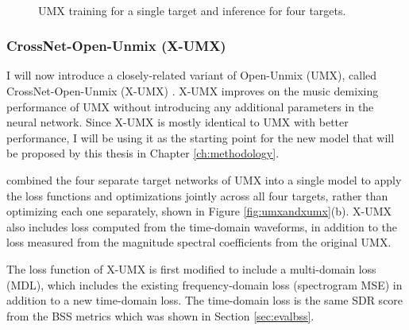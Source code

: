 \documentclass[report.tex]{subfiles}
\begin{document}
\begin{figure}[ht]
	\centering
	\\
	\caption{UMX training for a single target and inference for four targets.}
	\label{fig:umxes2}
\end{figure}

\subsubsection{CrossNet-Open-Unmix (X-UMX)}
\label{sec:xumx}

I will now introduce a closely-related variant of Open-Unmix (UMX), called CrossNet-Open-Unmix (X-UMX) \parencite{xumx}. X-UMX improves on the music demixing performance of UMX without introducing any additional parameters in the neural network. Since X-UMX is mostly identical to UMX with better performance, I will be using it as the starting point for the new model that will be proposed by this thesis in Chapter \ref{ch:methodology}.

\textcite{xumx} combined the four separate target networks of UMX into a single model to apply the loss functions and optimizations jointly across all four targets, rather than optimizing each one separately, shown in Figure \ref{fig:umxandxumx}(b). X-UMX also includes loss computed from the time-domain waveforms, in addition to the loss measured from the magnitude spectral coefficients from the original UMX.

The loss function of X-UMX is first modified to include a multi-domain loss (MDL), which includes the existing frequency-domain loss (spectrogram MSE) in addition to a new time-domain loss. The time-domain loss is the same SDR score from the BSS metrics which was shown in Section \ref{sec:evalbss}.
\end{document}
